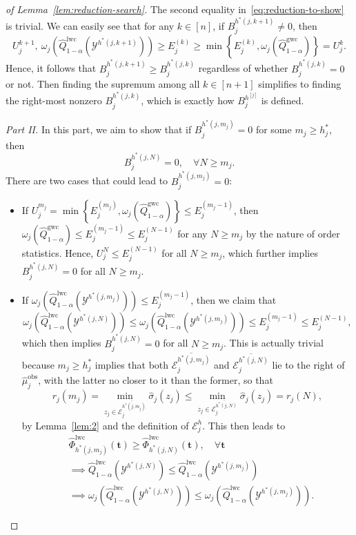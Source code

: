 \begin{proof}[of Lemma~\ref{lem:reduction-search}]
The second equality in~\eqref{eq:reduction-to-show}
is trivial. We can easily see that for any $k \in [n]$, if $B^{h^*(j,k+1)}_j \neq 0$, then
\[
U^{k+1}_j,\ \omega_j(\hat{Q}^{\mathrm{lwc}}_{1-\alpha}(\mathcal{Y}^{h^*(j,k+1)})) \geq E^{(k)}_j \geq \min\left\{E^{(k)}_j, \omega_j(\hat{Q}^{\mathrm{gwc}}_{1-\alpha})\right\} = U^k_j.
\]
Hence, it follows that $B^{h^*(j,k+1)}_j \geq B^{h^*(j,k)}_j$ regardless of whether $B^{h^*(j,k)}_j = 0$ or not. Then finding the supremum among all $k\in [n+1]$ simplifies to finding the right-most nonzero $B_j^{h^*(j,k)}$, which is exactly how $B^{h^{[j]}}_j$ is defined.

\textit{Part II.} In this part, we aim to show that if $B_j^{h^*(j,m_j)} =0$ for some $m_j \geq h^*_j$, then
\[
B_j^{h^*(j,N)} = 0, \quad \forall N\geq m_j.
\]
There are two cases that could lead to $B_j^{h^*(j,m_j)} =0$:
    \begin{itemize}
        \item If $U^{m_j}_j = \min\left\{E^{(m_j)}_j,\omega_j(\hat{Q}^{\mathrm{gwc}}_{1-\alpha})\right\} \leq E^{(m_j-1)}_j$, then $\omega_j(\hat{Q}^\mathrm{gwc}_{1-\alpha}) \leq E^{(m_j-1)}_j \leq E^{(N-1)}_j$ for any $N\geq m_j$ by the nature of order statistics. Hence, $U^N_j \leq E^{(N-1)}_j$ for all $N\geq m_j$, which further implies $B_j^{h^*(j,N)} = 0$ for all $N\geq m_j$.
        \item If $\omega_j(\hat{Q}^\mathrm{lwc}_{1-\alpha} (\mathcal{Y}^{h^*(j,m_j)})) \leq E^{(m_j-1)}_j$, then we claim that
        \[
        \omega_j(\hat{Q}^\mathrm{lwc}_{1-\alpha} (\mathcal{Y}^{h^*(j,N)})) \leq \omega_j(\hat{Q}^\mathrm{lwc}_{1-\alpha} (\mathcal{Y}^{h^*(j,m_j)})) \leq E^{(m_j-1)}_j \leq E^{(N-1)}_j,
        \]
        which then implies $B_j^{h^*(j,N)} =0$ for all $N\geq m_j$.
        This is actually trivial because $m_j \geq h^*_j$ implies that both $\overline{\mathcal{E}^{h^*(j,m_j)}_j}$ and $\overline{\mathcal{E}^{h^*(j,N)}_j}$ lie to the right of $\hat{\mu}^\mathrm{obs}_j$, with the latter no closer to it than the former, so that
        \[
        r_j(m_j) = \min_{z_j \in \overline{\mathcal{E}^{h^*(j, m_j)}_j}} \hat{\sigma}_j(z_j) \leq \min_{z_j \in \overline{\mathcal{E}^{h^*(j,N)}_j}} \hat{\sigma}_j(z_j) = r_j(N),
        \]
        by Lemma~\ref{lem:2} and the definition of $\mathcal{E}^h_j$. This then leads to
        \begin{align*}
            &\hat{\Phi}^{\mathrm{lwc}}_{h^*(j, m_j)}(\mathbf t) \geq \hat{\Phi}^{\mathrm{lwc}}_{h^*(j,N)}(\mathbf t), \quad \forall \mathbf t\\
            &\implies \hat{Q}^\mathrm{lwc}_{1-\alpha} (\mathcal{Y}^{h^*(j,N)}) \leq \hat{Q}^\mathrm{lwc}_{1-\alpha}(\mathcal{Y}^{h^*(j, m_j)})\\
            &\implies \omega_j(\hat{Q}^\mathrm{lwc}_{1-\alpha} (\mathcal{Y}^{h^*(j,N)})) \leq \omega_j(\hat{Q}^\mathrm{lwc}_{1-\alpha} (\mathcal{Y}^{h^*(j,m_j)})).
        \end{align*}
    \end{itemize}
\end{proof}



